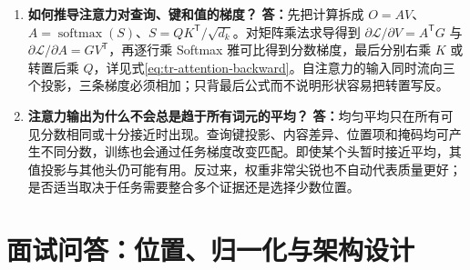 \documentclass[UTF8,12pt,a4paper,fontset=fandol]{ctexart}
\begin{document}
\begin{enumerate}[resume*=trquestions]
\item \textbf{如何推导注意力对查询、键和值的梯度？}
\textbf{答：}先把计算拆成 $O=AV$、$A=\operatorname{softmax}(S)$、$S=QK^{\mathsf T}/\sqrt{d_k}$。对矩阵乘法求导得到 $\partial\mathcal L/\partial V=A^{\mathsf T}G$ 与 $\partial\mathcal L/\partial A=GV^{\mathsf T}$，再逐行乘 Softmax 雅可比得到分数梯度，最后分别右乘 $K$ 或转置后乘 $Q$，详见式\eqref{eq:tr-attention-backward}。自注意力的输入同时流向三个投影，三条梯度必须相加；只背最后公式而不说明形状容易把转置写反。

\item \textbf{注意力输出为什么不会总是趋于所有词元的平均？}
\textbf{答：}均匀平均只在所有可见分数相同或十分接近时出现。查询键投影、内容差异、位置项和掩码均可产生不同分数，训练也会通过任务梯度改变匹配。即使某个头暂时接近平均，其值投影与其他头仍可能有用。反过来，权重非常尖锐也不自动代表质量更好；是否适当取决于任务需要整合多个证据还是选择少数位置。
\end{enumerate}

\section{面试问答：位置、归一化与架构设计}
\label{sec:tr-qa-architecture}
\end{document}
